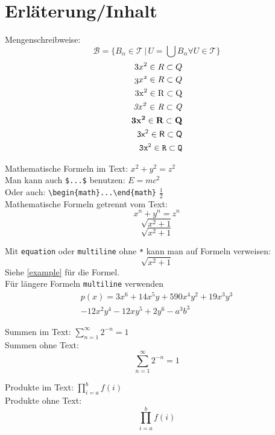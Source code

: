 \pagestyle{plain}
\chapter{Erläterung/Inhalt}

\noindent Mengenschreibweise:
\[
 \mathcal{B} = \{B_{\alpha} \in \mathcal{T}\, |\,  U = \bigcup B_{\alpha} \forall U \in \mathcal{T} \}
\]
\begin{align*}
    3x^2 \in R \subset Q \\
    \mathnormal{3x^2 \in R \subset Q} \\
    \mathrm{3x^2 \in R \subset Q} \\
    \mathit{3x^2 \in R \subset Q} \\
    \mathbf{3x^2 \in R \subset Q} \\
    \mathsf{3x^2 \in R \subset Q} \\
    \mathtt{3x^2 \in R \subset Q}
\end{align*}

\noindent Mathematische Formeln im Text: \(x^2 + y^2 = z^2\) \\
Man kann auch \texttt{\$...\$} benutzen: $E=mc^2$ \\
Oder auch: \verb|\begin{math}...\end{math}| \begin{math}\frac{1}{2}\end{math} \\

\noindent Mathematische Formeln getrennt vom Text: \[ x^n + y^n = z^n \] 
\begin{displaymath}
    \sqrt{x^2+1}
\end{displaymath}
\begin{equation*}
    \sqrt{x^2+1}
\end{equation*}

\noindent Mit \texttt{equation} oder \texttt{multiline} ohne \texttt{*} kann man auf Formeln verweisen:
\begin{equation} \label{example}
    \sqrt{x^2+1}
\end{equation}
\noindent Siehe \ref{example} für die Formel.\\

\noindent Für längere Formeln \texttt{multiline} verwenden
\begin{multline*}
    p(x) = 3x^6 + 14x^5y + 590x^4y^2 + 19x^3y^3\\ 
    - 12x^2y^4 - 12xy^5 + 2y^6 - a^3b^3
\end{multline*}

\newpage

\noindent Summen im Text: $\sum_{n=1}^{\infty} 2^{-n} = 1$ \\
Summen ohne Text: \[ \sum_{n=1}^{\infty} 2^{-n} = 1 \]

\noindent Produkte im Text: $\prod_{i=a}^{b} f(i)$ \\
Produkte ohne Text: \[ \prod_{i=a}^{b} f(i) \]

